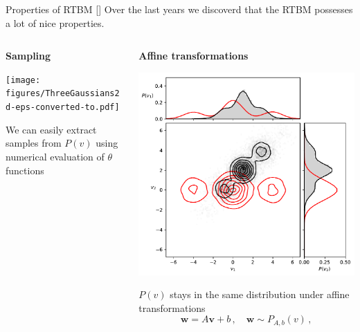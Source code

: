 \documentclass[10pt]{beamer}
\begin{document}
\begin{frame}{Properties of RTBM \hfill \small [\cite{Carrazza:2018nmd}]}
    Over the last years we discoverd that the RTBM possesses a lot of nice properties.
    \vspace{1cm}
    \begin{columns}

        \begin{column}{0.5 \textwidth}
            \centering
            \vspace{-0.5 cm}

            \textbf{Sampling}

            \texttt{[image: figures/ThreeGaussians2d-eps-converted-to.pdf]}

            We can easily extract samples from $P(v)$ using numerical
            evaluation of $\theta$ functions
        \end{column}

        \begin{column}{0.5 \textwidth}
            \centering

            \textbf{Affine transformations}

            \includegraphics[scale=0.40]{figures/rotation2d.pdf}

            $P(v)$ stays in the same distribution under affine
            transformations
            $$
            \mathbf w = A \mathbf v+b\,, \quad \mathbf w \sim P_{A,b}(v)\,,
            $$
        \end{column}


    
    \end{columns}

\end{frame}
\end{document}
